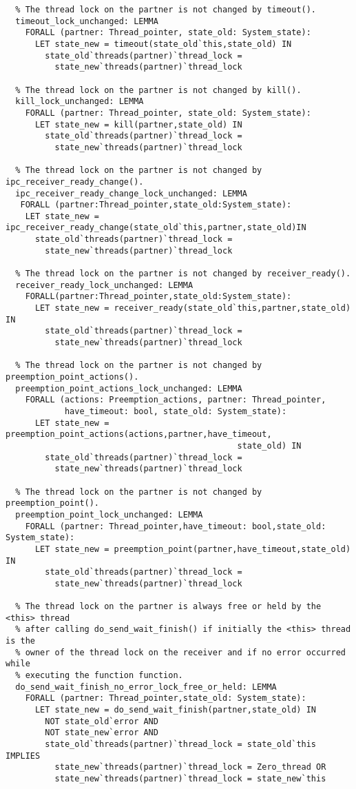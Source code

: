 \begin{lstlisting}
  % The thread lock on the partner is not changed by timeout().
  timeout_lock_unchanged: LEMMA
    FORALL (partner: Thread_pointer, state_old: System_state):
      LET state_new = timeout(state_old`this,state_old) IN
        state_old`threads(partner)`thread_lock = 
          state_new`threads(partner)`thread_lock

  % The thread lock on the partner is not changed by kill().
  kill_lock_unchanged: LEMMA
    FORALL (partner: Thread_pointer, state_old: System_state):
      LET state_new = kill(partner,state_old) IN
        state_old`threads(partner)`thread_lock = 
          state_new`threads(partner)`thread_lock

  % The thread lock on the partner is not changed by ipc_receiver_ready_change().
  ipc_receiver_ready_change_lock_unchanged: LEMMA 
   FORALL (partner:Thread_pointer,state_old:System_state):
    LET state_new = ipc_receiver_ready_change(state_old`this,partner,state_old)IN
      state_old`threads(partner)`thread_lock = 
        state_new`threads(partner)`thread_lock

  % The thread lock on the partner is not changed by receiver_ready().
  receiver_ready_lock_unchanged: LEMMA
    FORALL(partner:Thread_pointer,state_old:System_state):
      LET state_new = receiver_ready(state_old`this,partner,state_old) IN
        state_old`threads(partner)`thread_lock = 
          state_new`threads(partner)`thread_lock

  % The thread lock on the partner is not changed by preemption_point_actions().
  preemption_point_actions_lock_unchanged: LEMMA
    FORALL (actions: Preemption_actions, partner: Thread_pointer, 
            have_timeout: bool, state_old: System_state):
      LET state_new = preemption_point_actions(actions,partner,have_timeout,
                                               state_old) IN
        state_old`threads(partner)`thread_lock = 
          state_new`threads(partner)`thread_lock

  % The thread lock on the partner is not changed by preemption_point().
  preemption_point_lock_unchanged: LEMMA
    FORALL (partner: Thread_pointer,have_timeout: bool,state_old: System_state):
      LET state_new = preemption_point(partner,have_timeout,state_old) IN
        state_old`threads(partner)`thread_lock = 
          state_new`threads(partner)`thread_lock

  % The thread lock on the partner is always free or held by the <this> thread
  % after calling do_send_wait_finish() if initially the <this> thread is the
  % owner of the thread lock on the receiver and if no error occurred while
  % executing the function function.
  do_send_wait_finish_no_error_lock_free_or_held: LEMMA
    FORALL (partner: Thread_pointer,state_old: System_state):
      LET state_new = do_send_wait_finish(partner,state_old) IN
        NOT state_old`error AND 
        NOT state_new`error AND
        state_old`threads(partner)`thread_lock = state_old`this IMPLIES
          state_new`threads(partner)`thread_lock = Zero_thread OR
          state_new`threads(partner)`thread_lock = state_new`this


\end{lstlisting}
